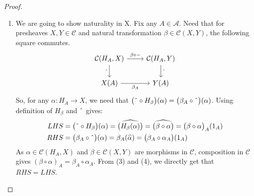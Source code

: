 \documentclass[18pt,a4paper]{article}
\theoremstyle{definition}
\begin{document}
\begin{proof}
\begin{enumerate}[label=\Roman*]
\begin{enumerate}[label=(\roman*)]
	\item We are going to show naturality in X. Fix any $A \in \mathcal{A}$. Need that for
		presheaves $X,Y \in \mathcal{C}$ and
		natural transformation $\beta \in \mathcal{C} (X,Y)$, the following
		square commutes.
		\begin{equation*}
		\begin{tikzcd}
			\mathcal{C}(H_A,X) \arrow[swap]{d}{ \string ^}
			\arrow{r}{\beta \circ -}
			& \mathcal{C}(H_A,Y) \arrow{d}{\string ^}\\
			X(A) \arrow[swap]{r}{\beta_A}
			& Y(A)
		\end{tikzcd}
		\end{equation*}
		So, for any $\alpha:H_A \to X$, we need that
		$\big( \string ^ \circ H_\beta \big)(\alpha) = \big( \beta_A \circ \string ^
		\big)(\alpha)$. Using definition of $H_\beta$ and $\string ^$ gives:
		\begin{align}
			LHS & = \big( \string ^ \circ H_\beta \big)(\alpha) =
			\widehat{\big(  H_\beta(\alpha)\big)}=
			\widehat{\big(  \beta \circ \alpha\big)}
			=\big(  \beta \circ \alpha\big)_A(1_A) \\
			RHS & = \big( \beta_A \circ \string ^ \big)(\alpha)
			= \beta_A (\widehat{\alpha}) =\big( \beta_A \circ \alpha_A\big)(1_A)
		\end{align}
		As $\alpha \in \mathcal{C} (H_A,X)$ and $\beta \in \mathcal{C}(X,Y)$
		are morphisms in $\mathcal{C}$, composition in $\mathcal{C}$ gives
		$(\beta \circ \alpha)_A = \beta_A \circ \alpha_A$. From (3) and (4), we
		directly get that $RHS=LHS$.


\end{enumerate}
\end{enumerate}
\end{proof}
\end{document}
